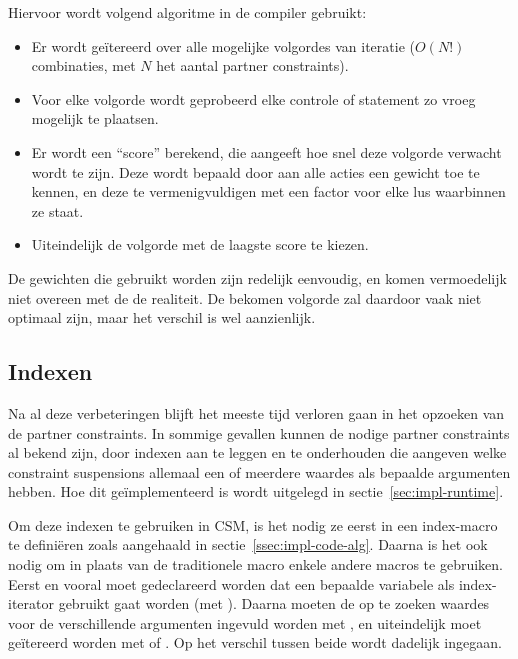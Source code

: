 Hiervoor wordt volgend algoritme in de compiler gebruikt: \begin{itemize}
  \item Er wordt ge\"itereerd over alle mogelijke volgordes van iteratie ($O(N!)$ combinaties, met $N$ het aantal partner constraints).
  \item Voor elke volgorde wordt geprobeerd elke controle of statement zo vroeg mogelijk te plaatsen.
  \item Er wordt een ``score'' berekend, die aangeeft hoe snel deze volgorde verwacht wordt te zijn. Deze wordt bepaald door aan alle acties een gewicht toe te kennen, en deze te vermenigvuldigen met een factor voor elke lus waarbinnen ze staat.
  \item Uiteindelijk de volgorde met de laagste score te kiezen.
\end{itemize}
De gewichten die gebruikt worden zijn redelijk eenvoudig, en komen vermoedelijk niet overeen met de de realiteit. De bekomen volgorde zal daardoor vaak niet optimaal zijn, maar het verschil is wel aanzienlijk.

\subsection{Indexen} \label{gencode-index}


Na al deze verbeteringen blijft het meeste tijd verloren gaan in het opzoeken van de partner constraints. In sommige gevallen kunnen de nodige partner constraints al bekend zijn, door indexen aan te leggen en te onderhouden die aangeven welke constraint suspensions allemaal een of meerdere waardes als bepaalde argumenten hebben. Hoe dit ge\"implementeerd is wordt uitgelegd in sectie~\ref{sec:impl-runtime}.

Om deze indexen te gebruiken in CSM, is het nodig ze eerst in een index-macro te defini\"eren zoals aangehaald in sectie~\ref{ssec:impl-code-alg}. Daarna is het ook nodig om in plaats van de traditionele  macro enkele andere macros te gebruiken. Eerst en vooral moet gedeclareerd worden dat een bepaalde variabele als index-iterator gebruikt gaat worden (met ). Daarna moeten de op te zoeken waardes voor de verschillende argumenten ingevuld worden met , en uiteindelijk moet ge\"itereerd worden met  of . Op het verschil tussen beide wordt dadelijk ingegaan.

